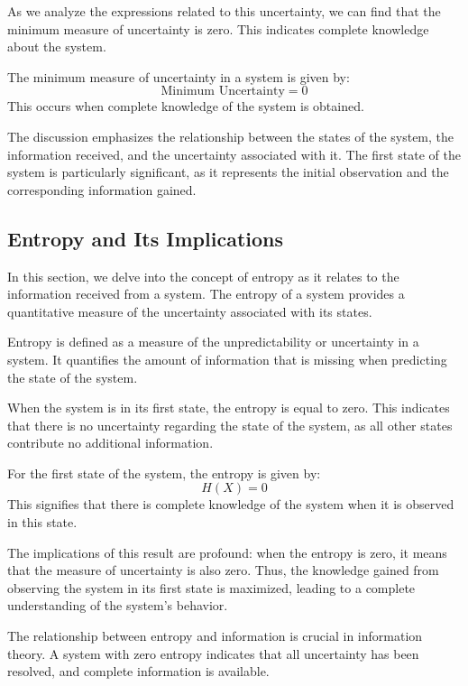 \documentclass[12pt,a4paper]{article}
\newenvironment{thmbox}[1][]{%
  \begin{tcolorbox}[enhanced, breakable, colback=thmcolor, colframe=blue!50!black, title=#1, fonttitle=\bfseries, arc=3pt, boxrule=0.5pt]
}{\end{tcolorbox}}
\newenvironment{defbox}[1][]{%
  \begin{tcolorbox}[enhanced, breakable, colback=defcolor, colframe=green!50!black, title=#1, fonttitle=\bfseries, arc=3pt, boxrule=0.5pt]
}{\end{tcolorbox}}
\newenvironment{rembox}[1][]{%
  \begin{tcolorbox}[enhanced, breakable, colback=gray!5, colframe=gray!50, title=#1, fonttitle=\bfseries, arc=3pt, boxrule=0.5pt]
}{\end{tcolorbox}}
\begin{document}
As we analyze the expressions related to this uncertainty, we can find that the minimum measure of uncertainty is zero. This indicates complete knowledge about the system.

\begin{thmbox}[Minimum Uncertainty]
The minimum measure of uncertainty in a system is given by:
\[
\text{Minimum Uncertainty} = 0
\]
This occurs when complete knowledge of the system is obtained.
\end{thmbox}

The discussion emphasizes the relationship between the states of the system, the information received, and the uncertainty associated with it. The first state of the system is particularly significant, as it represents the initial observation and the corresponding information gained.

\subsection{Entropy and Its Implications}
In this section, we delve into the concept of entropy as it relates to the information received from a system. The entropy of a system provides a quantitative measure of the uncertainty associated with its states.

\begin{defbox}[Entropy]
Entropy is defined as a measure of the unpredictability or uncertainty in a system. It quantifies the amount of information that is missing when predicting the state of the system.
\end{defbox}

When the system is in its first state, the entropy is equal to zero. This indicates that there is no uncertainty regarding the state of the system, as all other states contribute no additional information.

\begin{thmbox}[Entropy in the First State]
For the first state of the system, the entropy is given by:
\[
H(X) = 0
\]
This signifies that there is complete knowledge of the system when it is observed in this state.
\end{thmbox}

The implications of this result are profound: when the entropy is zero, it means that the measure of uncertainty is also zero. Thus, the knowledge gained from observing the system in its first state is maximized, leading to a complete understanding of the system's behavior.

\begin{rembox}[Conclusion on Entropy]
The relationship between entropy and information is crucial in information theory. A system with zero entropy indicates that all uncertainty has been resolved, and complete information is available.
\end{rembox}
\end{document}
